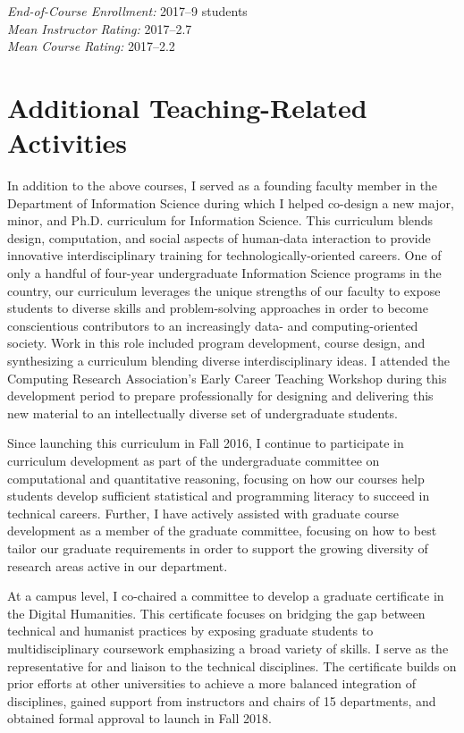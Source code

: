 \documentclass[11pt]{article}
\begin{document}
\emph{End-of-Course Enrollment: }2017--9 students\\
\emph{Mean Instructor Rating:} 2017--2.7\\
\emph{Mean Course Rating:} 2017--2.2

\section*{Additional Teaching-Related Activities}

In addition to the above courses, I served as a founding faculty member in the Department of Information Science during which I helped co-design a new major, minor, and Ph.D. curriculum for Information Science. This curriculum blends design, computation, and social aspects of human-data interaction to provide innovative interdisciplinary training for technologically-oriented careers.  One of only a handful of four-year undergraduate Information Science programs in the country, our curriculum leverages the unique strengths of our faculty to expose students to diverse skills and problem-solving approaches in order to become conscientious contributors to an increasingly data- and computing-oriented society. Work in this role included program development, course design, and synthesizing a curriculum blending diverse interdisciplinary ideas. I attended the Computing Research Association's Early Career Teaching Workshop during this development period to prepare professionally for designing and delivering this new material to an intellectually diverse set of undergraduate students. 

Since launching this curriculum in Fall 2016, I continue to participate in curriculum development as part of the undergraduate committee on computational and quantitative reasoning, focusing on how our courses help students develop sufficient statistical and programming literacy to succeed in technical careers. Further, I have actively assisted with graduate course development as a member of the graduate committee, focusing on how to best tailor our graduate requirements in order to support the growing diversity of research areas active in our department. 

At a campus level, I co-chaired a committee to develop a graduate certificate in the Digital Humanities. This certificate focuses on bridging the gap between technical and humanist practices by exposing graduate students to multidisciplinary coursework emphasizing a broad variety of skills. I serve as the representative for and liaison to the technical disciplines. The certificate builds on prior efforts at other universities to achieve a more balanced integration of disciplines, gained support from instructors and chairs of 15 departments, and obtained formal approval to launch in Fall 2018. 
\end{document}
